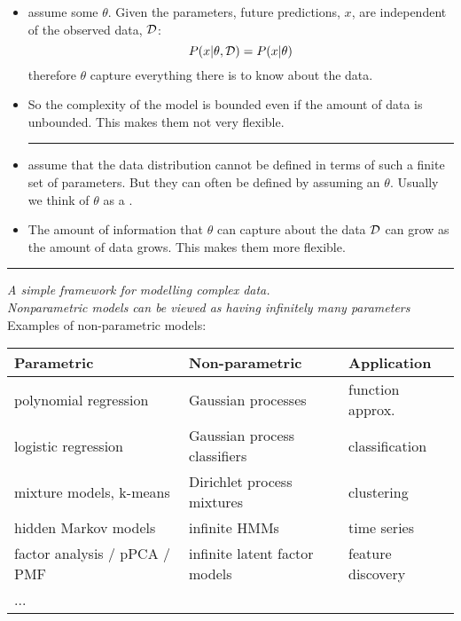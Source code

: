 
\begin{itemize}
\hrule

\item {} assume some  $\theta$. Given the parameters, future predictions, $x$, are
  independent of the observed data, $\mathcal{D}$:
\[
P(x|\theta,\mathcal{D}) = P(x|\theta)
\]
therefore $\theta$ capture everything there is
to know about the data.  
\item So the complexity of the model is bounded even
if the amount of data is unbounded. This makes them not very
flexible. \\[1ex] 

\hrule

\item {} assume that the data distribution
  cannot be defined in terms of such a finite set of parameters. But they
  can often be defined by assuming an  $\theta$. Usually we think of $\theta$ as a .
\item The amount of information that $\theta$ can capture about the data
  $\mathcal{D}$ can grow as the amount of data grows. This makes them more flexible.
\end{itemize}

\hrule


{\em A simple framework for modelling complex data.} \\

{\em Nonparametric models can be viewed as having
  infinitely many parameters} \\

Examples of non-parametric models: \\

\begin{tabular}{lll} \hline
Parametric & Non-parametric & Application \\ \hline
polynomial regression & Gaussian processes & function approx. \\
logistic regression & Gaussian process classifiers & classification \\
mixture models, k-means & Dirichlet process mixtures &
clustering \\
hidden Markov models & infinite HMMs & time series \\
factor analysis / pPCA / PMF & infinite latent factor models &
feature discovery \\
... & & \\
\hline
\end{tabular}

